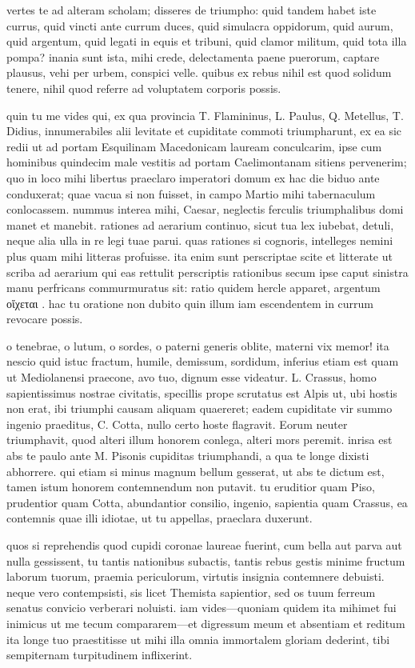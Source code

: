  vertes te ad alteram scholam; disseres de triumpho: quid tandem habet iste currus, quid vincti ante currum duces, quid simulacra oppidorum, quid aurum, quid argentum, quid legati in equis et tribuni, quid clamor militum, quid tota illa pompa? inania sunt ista, mihi crede, delectamenta paene puerorum, captare plausus, vehi per urbem, conspici velle. quibus ex rebus nihil est quod solidum tenere, nihil quod referre ad voluptatem corporis possis.

 quin tu me vides qui, ex qua provincia T. Flamininus, L. Paulus, Q. Metellus, T. Didius, innumerabiles alii levitate et cupiditate commoti triumpharunt, ex ea sic redii ut ad portam Esquilinam Macedonicam lauream conculcarim, ipse cum hominibus quindecim male vestitis ad portam Caelimontanam sitiens pervenerim; quo in loco mihi libertus praeclaro imperatori domum ex hac die biduo ante conduxerat; quae vacua si non fuisset, in campo Martio mihi tabernaculum conlocassem. nummus interea mihi, Caesar, neglectis ferculis triumphalibus domi manet et manebit. rationes ad aerarium continuo, sicut tua lex iubebat, detuli, neque alia ulla in re legi tuae parui. quas rationes si cognoris, intelleges nemini plus quam mihi litteras profuisse. ita enim sunt perscriptae scite et litterate ut scriba ad aerarium qui eas rettulit perscriptis rationibus secum ipse caput sinistra manu perfricans commurmuratus sit: ratio quidem hercle apparet, argentum οἴχεται . hac tu oratione non dubito quin illum iam escendentem in currum revocare possis.

 o tenebrae, o lutum, o sordes, o paterni generis oblite, materni vix memor! ita nescio quid istuc fractum, humile, demissum, sordidum, inferius etiam est quam ut Mediolanensi praecone, avo tuo, dignum esse videatur. L. Crassus, homo sapientissimus nostrae civitatis, specillis prope scrutatus est Alpis ut, ubi hostis non erat, ibi triumphi causam aliquam quaereret; eadem cupiditate vir summo ingenio praeditus, C. Cotta, nullo certo hoste flagravit. Eorum neuter triumphavit, quod alteri illum honorem conlega, alteri mors peremit. inrisa est abs te paulo ante M. Pisonis cupiditas triumphandi, a qua te longe dixisti abhorrere. qui etiam si minus magnum bellum gesserat, ut abs te dictum est, tamen istum honorem contemnendum non putavit. tu eruditior quam Piso, prudentior quam Cotta, abundantior consilio, ingenio, sapientia quam Crassus, ea contemnis quae illi idiotae, ut tu appellas, praeclara duxerunt.

 quos si reprehendis quod cupidi coronae laureae fuerint, cum bella aut parva aut nulla gessissent, tu tantis nationibus subactis, tantis rebus gestis minime fructum laborum tuorum, praemia periculorum, virtutis insignia contemnere debuisti. neque vero contempsisti, sis licet Themista sapientior, sed os tuum ferreum senatus convicio verberari noluisti. iam vides—quoniam quidem ita mihimet fui inimicus ut me tecum compararem—et digressum meum et absentiam et reditum ita longe tuo praestitisse ut mihi illa omnia immortalem gloriam dederint, tibi sempiternam turpitudinem inflixerint.

